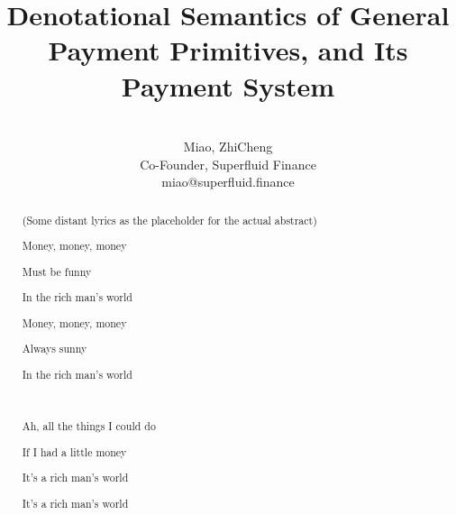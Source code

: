 \makeatletter
{}
\makeatother

\usepackage[
    backend=biber,
    style=alphabetic,
]{biblatex}

\long{} %
\newcommand{\eg}{\textit{e}.\textit{g}.}
\newcommand{\ie}{\textit{i}.\textit{e}.}
\newcommand{\etal}{\textit{et al}.}


\title{Denotational Semantics of General Payment Primitives, and Its Payment System}

\author{\\
    Miao, ZhiCheng\\
    Co-Founder, Superfluid Finance\\
    miao@superfluid.finance
}


\maketitle

\begin{abstract}
    \begin{center}
        (Some distant lyrics as the placeholder for the actual abstract)

        Money, money, money

        Must be funny

        In the rich man's world

        Money, money, money

        Always sunny

        In the rich man's world

        \

        Ah, all the things I could do

        If I had a little money

        It's a rich man's world

        It's a rich man's world
    \end{center}
\end{abstract}

